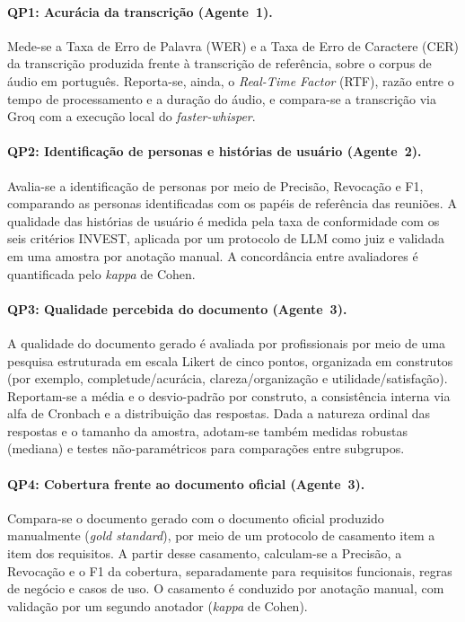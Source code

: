 \paragraph{QP1: Acurácia da transcrição (Agente~1).}
Mede-se a Taxa de Erro de Palavra (WER) e a Taxa de Erro de Caractere (CER) da transcrição produzida frente à transcrição de referência, sobre o corpus de áudio em português. Reporta-se, ainda, o \textit{Real-Time Factor} (RTF), razão entre o tempo de processamento e a duração do áudio, e compara-se a transcrição via Groq com a execução local do \textit{faster-whisper}.

\paragraph{QP2: Identificação de personas e histórias de usuário (Agente~2).}
Avalia-se a identificação de personas por meio de Precisão, Revocação e F1, comparando as personas identificadas com os papéis de referência das reuniões. A qualidade das histórias de usuário é medida pela taxa de conformidade com os seis critérios INVEST, aplicada por um protocolo de LLM como juiz e validada em uma amostra por anotação manual. A concordância entre avaliadores é quantificada pelo \textit{kappa} de Cohen.

\paragraph{QP3: Qualidade percebida do documento (Agente~3).}
A qualidade do documento gerado é avaliada por profissionais por meio de uma pesquisa estruturada em escala Likert de cinco pontos, organizada em construtos (por exemplo, completude/acurácia, clareza/organização e utilidade/satisfação). Reportam-se a média e o desvio-padrão por construto, a consistência interna via alfa de Cronbach e a distribuição das respostas. Dada a natureza ordinal das respostas e o tamanho da amostra, adotam-se também medidas robustas (mediana) e testes não-paramétricos para comparações entre subgrupos.

\paragraph{QP4: Cobertura frente ao documento oficial (Agente~3).}
Compara-se o documento gerado com o documento oficial produzido manualmente (\textit{gold standard}), por meio de um protocolo de casamento item a item dos requisitos. A partir desse casamento, calculam-se a Precisão, a Revocação e o F1 da cobertura, separadamente para requisitos funcionais, regras de negócio e casos de uso. O casamento é conduzido por anotação manual, com validação por um segundo anotador (\textit{kappa} de Cohen).

